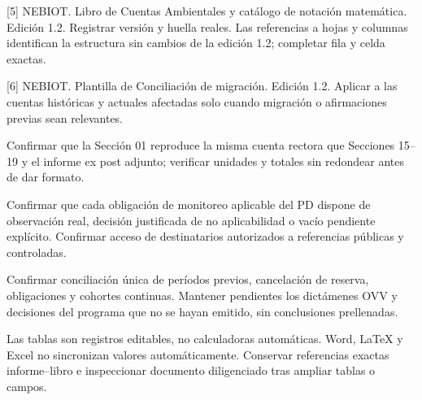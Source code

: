 [5] NEBIOT. Libro de Cuentas Ambientales y catálogo de notación matemática. Edición 1.2. Registrar versión y huella reales. Las referencias a hojas y columnas identifican la estructura sin cambios de la edición 1.2; completar fila y celda exactas.\par\vspace{2mm}
[6] NEBIOT. Plantilla de Conciliación de migración. Edición 1.2. Aplicar a las cuentas históricas y actuales afectadas solo cuando migración o afirmaciones previas sean relevantes.\par\vspace{2mm}
Confirmar que la Sección 01 reproduce la misma cuenta rectora que Secciones 15–19 y el informe ex post adjunto; verificar unidades y totales sin redondear antes de dar formato.\par
Confirmar que cada obligación de monitoreo aplicable del PD dispone de observación real, decisión justificada de no aplicabilidad o vacío pendiente explícito. Confirmar acceso de destinatarios autorizados a referencias públicas y controladas.\par
Confirmar conciliación única de períodos previos, cancelación de reserva, obligaciones y cohortes continuas. Mantener pendientes los dictámenes OVV y decisiones del programa que no se hayan emitido, sin conclusiones prellenadas.\par
Las tablas son registros editables, no calculadoras automáticas. Word, LaTeX y Excel no sincronizan valores automáticamente. Conservar referencias exactas informe–libro e inspeccionar documento diligenciado tras ampliar tablas o campos.\par
